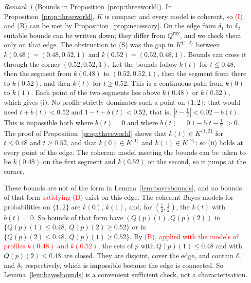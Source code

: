 \documentclass[11pt]{article}
\theoremstyle{definition}
\theoremstyle{remark}
\newtheorem{remark}[theorem]{Remark}
\begin{document}
\begin{remark}[Bounds in Proposition~\ref{prop:threeworld}]\label{rem:threeworld-bounds}
In Proposition~\ref{prop:threeworld}, $K$ is compact and every model is coherent, so \textcolor{red}{(I)} and (B) can be met by Proposition~\ref{prop:necessary}. On the edge from $\delta_1$ to $\delta_2$ suitable bounds can be written down; they differ from $Q^{\mathrm{ray}}$, and we check them only on that edge. The obstruction to (S) was the gap in $K^{\{1,2\}}$ between $k(0.48)=(0.48,0.52,1)$ and $k(0.52)=(0.52,0.48,1)$. Bounds can cross it through the corner $(0.52,0.52,1)$. Let the bounds follow $k(t)$ for $t\le0.48$, then the segment from $k(0.48)$ to $(0.52,0.52,1)$, then the segment from there to $k(0.52)$, and then $k(t)$ for $t\ge0.52$. This is a continuous path from $k(0)$ to $k(1)$. Each point of the two segments lies above $k(0.48)$ or $k(0.52)$, which gives (i). No profile strictly dominates such a point on $\{1,2\}$: that would need $t+b(t)<0.52$ and $1-t+b(t)<0.52$, that is, $|t-\tfrac12|<0.02-b(t)$. This is impossible both where $b(t)=0$ and where $b(t)=0.1-5|t-\tfrac12|>0$. The proof of Proposition~\ref{prop:threeworld} shows that $k(t)\in K^{\{1,2\}}$ for $t\le0.48$ and $t\ge0.52$, and that $k(0)\in K^{\{1\}}$ and $k(1)\in K^{\{2\}}$; so (ii) holds at every point of the edge. The coherent model meeting the bounds can be taken to be $k(0.48)$ on the first segment and $k(0.52)$ on the second, so it jumps at the corner.

These bounds are not of the form in Lemma~\ref{lem:bayesbounds}, and no bounds of that form \textcolor{red}{satisfying (B)} exist on this edge. The coherent Bayes models for probabilities on $\{1,2\}$ are $k(0)$, $k(1)$, and, for $(\tfrac12,\tfrac12)$, the $k(t)$ with $b(t)=0$. So bounds of that form have $(Q(p)(1),Q(p)(2))$ in $\{Q(p)(1)\le0.48,\ Q(p)(2)\ge0.52\}$ or in $\{Q(p)(2)\le0.48,\ Q(p)(1)\ge0.52\}$. By \textcolor{red}{(B), applied with the models of profiles $k(0.48)$ and $k(0.52)$,} the sets of $p$ with $Q(p)(1)\le0.48$ and with $Q(p)(2)\le0.48$ are closed. They are disjoint, cover the edge, and contain $\delta_1$ and $\delta_2$ respectively, which is impossible because the edge is connected. So Lemma~\ref{lem:bayesbounds} is a convenient sufficient check, not a characterisation.
\end{remark}
\end{document}
